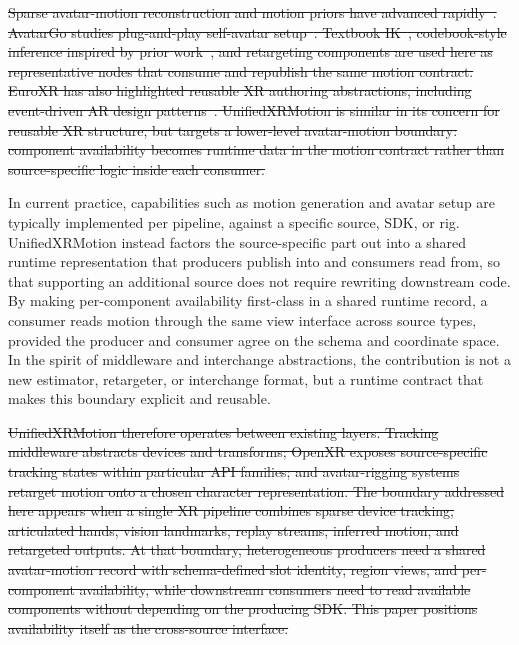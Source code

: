 \documentclass[runningheads]{llncs}
\newcommand{\radd}[1]{\textcolor{revadd}{#1}}
\newcommand{\rdel}[1]{\textcolor{revdel}{\sout{#1}}}
\newcommand{\radd}[1]{#1}
\newcommand{\rdel}[1]{}
\begin{document}
\rdel{
Sparse avatar-motion reconstruction and motion priors have advanced rapidly~\cite{jiang2022avatarposer,dai2024hmd,yang2021lobstr,jiang2024egoposer,starke2024categorical}. 
AvatarGo studies plug-and-play self-avatar setup~\cite{ponton2022avatargo}. Textbook IK~\cite{aristidou2011fabrik}, codebook-style inference inspired by prior work~\cite{starke2024categorical}, and retargeting components are used here as representative nodes that consume and republish the same motion contract. 
EuroXR has also highlighted reusable XR authoring abstractions, including event-driven AR design patterns~\cite{ackermann2023arpatterns}. 
UnifiedXRMotion is similar in its concern for reusable XR structure, but targets a lower-level avatar-motion boundary: component availability becomes runtime data in the motion contract rather than source-specific logic inside each consumer.
}

\radd{
  In current practice, capabilities such as motion generation and avatar setup are typically implemented per pipeline, against a specific source, SDK, or rig.
  UnifiedXRMotion instead factors the source-specific part out into a shared runtime representation that producers publish into and consumers read from, so that supporting an additional source does not require rewriting downstream code.
By making per-component availability first-class in a shared runtime record, a consumer reads motion through the same view interface across source types, provided the producer and consumer agree on the schema and coordinate space.
In the spirit of middleware and interchange abstractions, the contribution is not a new estimator, retargeter, or interchange format, but a runtime contract that makes this boundary explicit and reusable.}

\rdel{
UnifiedXRMotion therefore operates between existing layers. Tracking middleware abstracts devices and transforms; OpenXR exposes source-specific tracking states within particular API families; and avatar-rigging systems retarget motion onto a chosen character representation. 
The boundary addressed here appears when a single XR pipeline combines sparse device tracking, articulated hands, vision landmarks, replay streams, inferred motion, and retargeted outputs. At that boundary, heterogeneous producers need a shared avatar-motion record with schema-defined slot identity, region views, and per-component availability, while downstream consumers need to read available components without depending on the producing SDK. This paper positions availability itself as the cross-source interface.}
\end{document}
